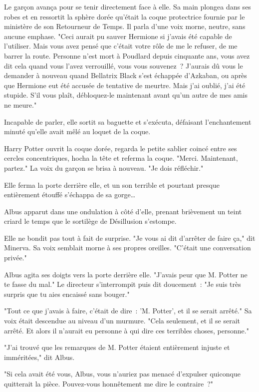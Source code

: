 Le garçon avança pour se tenir directement face à elle. Sa main plongea dans ses robes et en ressortit la sphère dorée qu'était la coque protectrice fournie par le ministère de son Retourneur de Temps. Il parla d'une voix morne, neutre, sans aucune emphase. "Ceci aurait pu sauver Hermione si j'avais été capable de l'utiliser. Mais vous avez pensé que c'était votre rôle de me le refuser, de me barrer la route. Personne n'est mort à Poudlard depuis cinquante ans, vous avez dit cela quand vous l'avez verrouillé, vous vous souvenez~? J'aurais dû vous le demander à nouveau quand Bellatrix Black s'est échappée d'Azkaban, ou après que Hermione eut été accusée de tentative de meurtre. Mais j'ai oublié, j'ai été stupide. S'il vous plaît, débloquez-le maintenant avant qu'un autre de mes amis ne meure."

Incapable de parler, elle sortit sa baguette et s'exécuta, défaisant l'enchantement minuté qu'elle avait mêlé au loquet de la coque.

Harry Potter ouvrit la coque dorée, regarda le petite sablier coincé entre ses cercles concentriques, hocha la tête et referma la coque. "Merci. Maintenant, partez." La voix du garçon se brisa à nouveau. "Je dois réfléchir."

\later

Elle ferma la porte derrière elle, et un son terrible et pourtant presque entièrement étouffé s'échappa de sa gorge…

Albus apparut dans une ondulation à côté d'elle, prenant brièvement un teint criard le temps que le sortilège de Désillusion s'estompe.

Elle ne bondit pas tout à fait de surprise. "Je vous ai dit d'arrêter de faire ça," dit Minerva. Sa voix semblait morne à ses propres oreilles. "C'était une conversation privée."

Albus agita ses doigts vers la porte derrière elle. "J'avais peur que M. Potter ne te fasse du mal." Le directeur s'interrompit puis dit doucement~: "Je suis très surpris que tu aies encaissé sans bouger."

"Tout ce que j'avais à faire, c'était de dire~: 'M. Potter', et il se serait arrêté." Sa voix était descendue au niveau d'un murmure. "Cela seulement, et il se serait arrêté. Et alors il n'aurait eu personne à qui dire ces terribles choses, personne."

"J'ai trouvé que les remarques de M. Potter étaient entièrement injuste et imméritées," dit Albus.

"Si cela avait été vous, Albus, vous n'auriez pas menacé d'expulser quiconque quitterait la pièce. Pouvez-vous honnêtement me dire le contraire~?"


